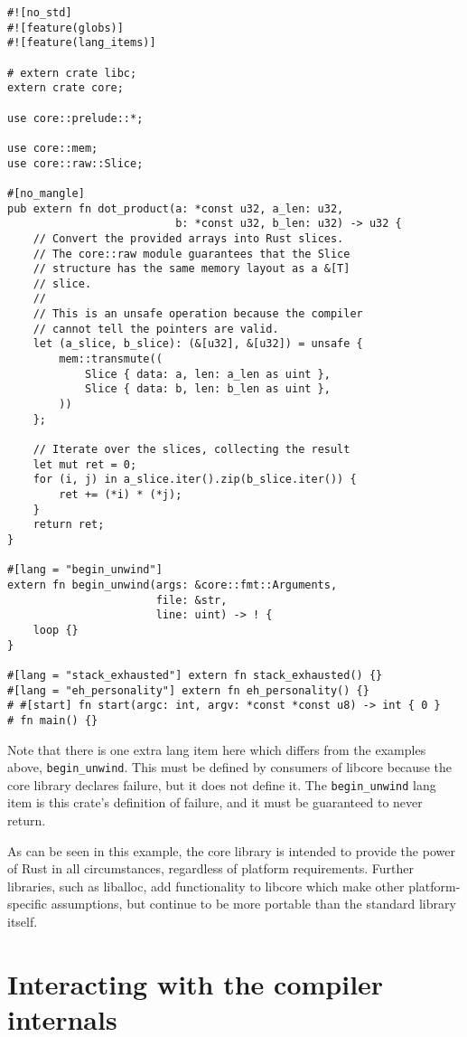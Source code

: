 \documentclass[]{article}
\begin{document}
\begin{verbatim}
#![no_std]
#![feature(globs)]
#![feature(lang_items)]

# extern crate libc;
extern crate core;

use core::prelude::*;

use core::mem;
use core::raw::Slice;

#[no_mangle]
pub extern fn dot_product(a: *const u32, a_len: u32,
                          b: *const u32, b_len: u32) -> u32 {
    // Convert the provided arrays into Rust slices.
    // The core::raw module guarantees that the Slice
    // structure has the same memory layout as a &[T]
    // slice.
    //
    // This is an unsafe operation because the compiler
    // cannot tell the pointers are valid.
    let (a_slice, b_slice): (&[u32], &[u32]) = unsafe {
        mem::transmute((
            Slice { data: a, len: a_len as uint },
            Slice { data: b, len: b_len as uint },
        ))
    };

    // Iterate over the slices, collecting the result
    let mut ret = 0;
    for (i, j) in a_slice.iter().zip(b_slice.iter()) {
        ret += (*i) * (*j);
    }
    return ret;
}

#[lang = "begin_unwind"]
extern fn begin_unwind(args: &core::fmt::Arguments,
                       file: &str,
                       line: uint) -> ! {
    loop {}
}

#[lang = "stack_exhausted"] extern fn stack_exhausted() {}
#[lang = "eh_personality"] extern fn eh_personality() {}
# #[start] fn start(argc: int, argv: *const *const u8) -> int { 0 }
# fn main() {}
\end{verbatim}

Note that there is one extra lang item here which differs from the
examples above, \texttt{begin\_unwind}. This must be defined by
consumers of libcore because the core library declares failure, but it
does not define it. The \texttt{begin\_unwind} lang item is this crate's
definition of failure, and it must be guaranteed to never return.

As can be seen in this example, the core library is intended to provide
the power of Rust in all circumstances, regardless of platform
requirements. Further libraries, such as liballoc, add functionality to
libcore which make other platform-specific assumptions, but continue to
be more portable than the standard library itself.

\section{Interacting with the compiler
internals}\label{interacting-with-the-compiler-internals}
\end{document}
